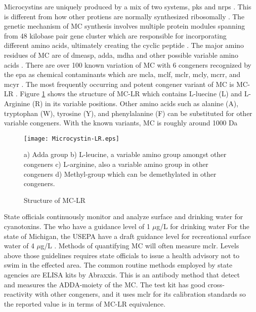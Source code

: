Microcystins are uniquely produced by a mix of two systems, \gls{pks} and  \gls{nrps} \cite{tillett_structural_2000}. This is different from how other protiens are normally synthesized ribosomally . The genetic mechanism of MC synthesis involves multiple protein modules spanning from 48 kilobase pair gene cluster which are responsible for incorporating different amino acids, ultimately creating the cyclic peptide \cite{moffitt_characterization_2004,nishizawa_genetic_1999}. The major amino residues of MC  are of \gls{dmeasp}, \gls{adda},  \gls{mdha} and other possible variable amino acids \cite{trogen_conformational_1996,nishizawa_genetic_1999}.
There are over 100 known variation of MC with 6 congeners recognized by the \gls{epa} as chemical contaminants which are \gls{mcla}, \gls{mclf}, \gls{mclr}, \gls{mcly}, \gls{mcrr}, and \gls{mcyr} \cite{puddick_modulation_2016}. The most frequently occurring and potent congener variant of MC is MC-LR \cite{rastogi_cyanotoxin-microcystins:_2014}. Figure \ref{fig:structure1} shows the structure of MC-LR which contains L-luecine (L) and L-Arginine (R) in its variable positions. Other amino acids such as alanine (A), tryptophan (W), tyrosine (Y), and phenylalanine (F) can be substituted for other variable congeners.
With the known variants, MC is roughly around 1000 Da \cite{dittmann_cyanobacterial_2012}



 \begin{figure}[t]
   \texttt{[image: Microcystin-LR.eps]}
   \caption{Structure of MC-LR}
   \label{fig:structure1}
   \begin{flushleft}
   a) Adda group
   b) L-leucine, a variable amino group amongst other congeners
   c) L-arginine, also a variable amino group in other congeners
   d) Methyl-group which can be demethylated in other congeners.
     \end{flushleft}

 \end{figure}

State officials continuously monitor and analyze surface and drinking water for cyanotoxins. The \gls{who} have a guidance level of 1 $\mu$g/L for drinking water \cite{world_health_organization_guidelines_2003} For the state of Michigan, the USEPA have a draft guidance level for recreational surface water of 4 $\mu$g/L \cite{usepa_draft_2016}. Methods of quantifying MC will often measure \gls{mclr}. Levels above those guidelines requires state officials to issue a health advisory not to swim in the effected area.  The common routine methods employed by state agencies are ELISA kits by Abraxxis. This is an antibody method that detect and measures the ADDA-moiety of the MC.
The test kit has good cross-reactivity with other congeners, and it uses \gls{mclr} for its calibration standards so the reported value is in terms of MC-LR equivalence.



